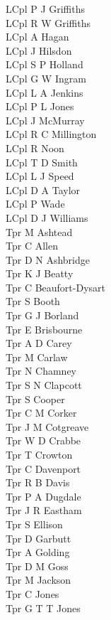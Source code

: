 \begin{multicols}{3}
  LCpl P J Griffiths \\
  LCpl R W Griffiths \\
  LCpl A Hagan \\
  LCpl J Hilsdon \\
  LCpl S P Holland \\
  LCpl G W Ingram \\
  LCpl L A Jenkins \\
  LCpl P L Jones \\
  LCpl J McMurray \\
  LCpl R C Millington \\
  LCpl R Noon \\
  LCpl T D Smith \\
  LCpl L J Speed \\
  LCpl D A Taylor \\
  LCpl P Wade \\
  LCpl D J Williams \\
  Tpr M Ashtead \\
  Tpr C Allen \\
  Tpr D N Ashbridge \\
  Tpr K J Beatty \\
  Tpr C Beaufort-Dysart \\
  Tpr S Booth \\
  Tpr G J Borland \\
  Tpr E Brisbourne \\
  Tpr A D Carey \\
  Tpr M Carlaw \\
  Tpr N Chamney \\
  Tpr S N Clapcott \\
  Tpr S Cooper \\
  Tpr C M Corker \\
  Tpr J M Cotgreave \\
  Tpr W D Crabbe \\
  Tpr T Crowton \\
  Tpr C Davenport \\
  Tpr R B Davis \\
  Tpr P A Dugdale \\
  Tpr J R Eastham \\
  Tpr S Ellison \\
  Tpr D Garbutt \\
  Tpr A Golding \\
  Tpr D M Goss \\
  Tpr M Jackson \\
  Tpr C Jones \\
  Tpr G T T Jones \\

\end{multicols}
